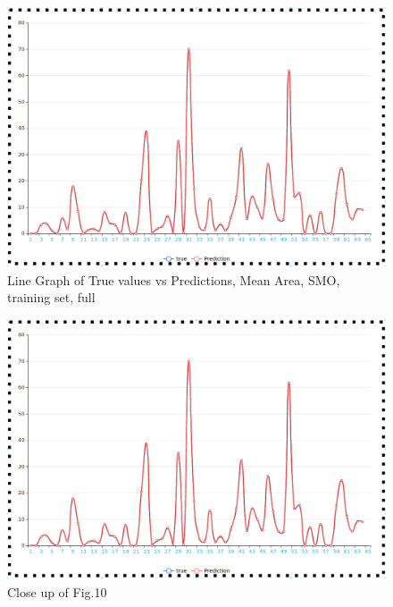\documentclass[runningheads]{llncs}
\begin{document}
\begin{figure}[H]
    \caption{Line Graph of True values vs Predictions, Mean Area, SMO, training set, full}\label{LGM}
    \centerline{\includegraphics[width=1\columnwidth]{imagens/LineGraphMean.png}}
\end{figure}
\begin{figure}[H]
    \caption{Close up of Fig.10}\label{LGM2}
    \centerline{\includegraphics[width=1\columnwidth]{imagens/LineGraphMean.png}}
\end{figure}
\end{document}

